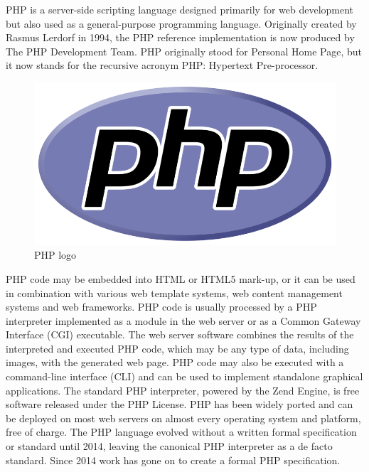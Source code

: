 PHP is a server-side scripting language designed primarily for web development but
also used as a general-purpose programming language. Originally created by Rasmus
Lerdorf  in 1994, the PHP reference implementation is now produced by The PHP Development
Team. PHP originally stood for Personal Home Page, but it now stands for the recursive
acronym PHP: Hypertext Pre-processor.
\begin{figure}[ht]
\centering
\includegraphics[scale=0.5]{images/php.png}
\caption{PHP logo}
\end{figure}

PHP code may be embedded into HTML or HTML5 mark-up, or it can be used in combination
with various web template systems, web content management systems and web frameworks.
PHP code is usually processed by a PHP interpreter implemented as a module in the web
server or as a Common Gateway Interface (CGI) executable. The web server software combines
the results of the interpreted and executed PHP code, which may be any type of data,
including images, with the generated web page. PHP code may also be executed with a command-line
interface (CLI) and can be used to implement standalone graphical applications.
The standard PHP interpreter, powered by the Zend Engine, is free software released under the PHP
License. PHP has been widely ported and can be deployed on most web servers on almost every operating system and platform, free of charge.
 The PHP language evolved without a written formal specification or standard until 2014, leaving the canonical PHP interpreter as a de facto standard. Since 2014 work has gone on to create a formal PHP specification.
